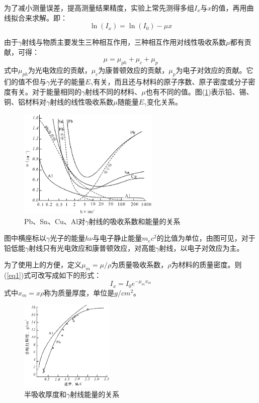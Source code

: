 \documentclass[a4paper]{article}
\begin{document}
为了减小测量误差，提高测量结果精度，实验上常先测得多组$I_x$与$x$的值，再用曲线拟合来求解。即：
\begin{equation}
    \ln(I_x) = \ln(I_0) - \mu x\label{eq2}
\end{equation}

由于$\gamma$射线与物质主要发生三种相互作用，三种相互作用对线性吸收系数$\mu$都有贡献，可得：
\begin{equation}
    \mu = \mu_{ph} + \mu_{c} + \mu_{p}\label{eq3}
\end{equation}
式中$\mu_{ph}$为光电效应的贡献，$\mu_{c}$为康普顿效应的贡献，$\mu_{p}$为电子对效应的贡献。它们的值不但与$\gamma$光子的能量$E_{\gamma}$有关，而且还与材料的原子序数、原子密度或分子密度有关。对于能量相同的$\gamma$射线不同的材料、$\mu$也有不同的值。图(\ref{fig1})表示铅、锡、铜、铝材料对$\gamma$射线的线性吸收系数$\mu$随能量$E_{\gamma}$变化关系。
\begin{figure}[!h]
    \centering
    \includegraphics[width=0.6\textwidth]{fig/fig1.pdf}
    \caption{Pb、Sn、Cu、Al对$\gamma$射线的吸收系数和能量的关系}\label{fig1}
\end{figure}

图中横座标以$\gamma$光子的能量$h\nu$与电子静止能量$m_ec^2$的比值为单位，由图可见，对于铅低能$\gamma$射线只有光电效应和康普顿效应，对高能$\gamma$射线，以电子对效应为主。

为了使用上的方便，定义$\mu_m = \mu/\rho$为质量吸收系数，$\rho$为材料的质量密度。则(\ref{eq1})式可改写成如下的形式：
\begin{equation}
    I_x = I_0e^{-\mu_m x_m}\label{eq4}
\end{equation}
式中$x_m = x\rho$称为质量厚度，单位是$g/cm^2$。
\begin{figure}[!h]
    \centering
    \includegraphics[width=0.4\textwidth]{fig/fig3.pdf}
    \caption{半吸收厚度和$\gamma$射线能量的关系}\label{fig3}
\end{figure}
\end{document}
